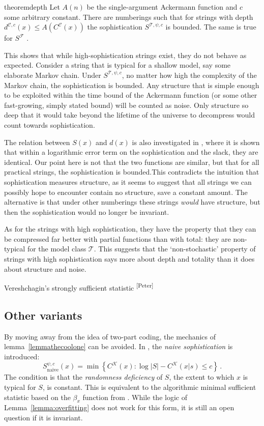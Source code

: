 \documentclass{style/llncs}
\newcommand{\C}{\mathscr C}
\newcommand{\T}{\mathscr T}
\newcommand{\F}{\mathscr F}
\newcommand{\K}{\mathscr K}
\newcommand{\s}{S}
\newcommand{\p}{\,\text{.}}
\newcommand{\pb}[1]{\textcolor{OliveGreen}{\small #1 \textsuperscript{[Peter]} }}
\begin{document}
\begin{restatable}{theorem}{depth}
Let $A(n)$ be the single-argument Ackermann function and $c$ some arbitrary constant. There are numberings such that for strings with depth $d^{\C,c}(x) \leq A(C^\C(x))$ the sophistication $\s^{\T, \psi, c}$ is bounded. The same is true for $\s^{\F}$ .
\end{restatable}
\noindent This shows that while high-sophistication strings exist, they do not behave as expected. Consider a string that is typical for a shallow model, say some elaborate Markov chain. Under $\s^{\T,\psi,c}$, no matter how high the complexity of the Markov chain, the sophistication is bounded. Any structure that is simple enough to be exploited within the time bound of the Ackermann function (or some other fast-growing, simply stated bound) will be counted as noise. Only structure so deep that it would take beyond the lifetime of the universe to decompress would count towards sophistication. 

The relation between $S(x)$ and $d(x)$ is also investigated in \cite{antunes2013sophistication}, where it is shown that within a logarithmic error term on the sophistication and the slack, they are identical. Our point here is not that the two functions are similar, but that for all practical strings, the sophistication is bounded.This contradicts the intuition that sophistication measures structure, as it seems to suggest that all strings we can possibly hope to encounter contain no structure, save a constant amount. The alternative is that under other numberings these strings \emph{would} have structure, but then the sophistication would no longer be invariant.

As for the strings with high sophistication, they have the property that they can be compressed far better with partial functions than with total: they are non-typical for the model class $\T$. This suggests that the `non-stochastic' property of strings with high sophistication \cite{shen1983concept,vereshchagin2004kolmogorov} says more about depth and totality than it does about structure and noise.

\pb{Vereshchagin's strongly sufficient statistic \cite{vereshchagin2013algorithmic}}

\subsection{Other variants}

By moving away from the idea of two-part coding, the mechanics of lemma~\ref{lemmathecoolone} can be avoided. In \cite{mota2013sophistication}, the \emph{naive sophistication} is introduced:
\[
\s_\text{naive}^{\psi, c}(x) = \min\left\{C^\K(x) : \log |S| - C^\K(x|s) \leq c \right\} \p
\] 
The condition is that the \emph{randomness deficiency} of $S$, the extent to which $x$ is typical for $S$, is constant. This is equivalent to the algorithmic minimal sufficient statistic based on the $\beta_x$ function from \cite{vereshchagin2004kolmogorov}. While the logic of Lemma~\ref{lemma:overfitting} does not work for this form, it is still an open question if it is invariant.
\end{document}
